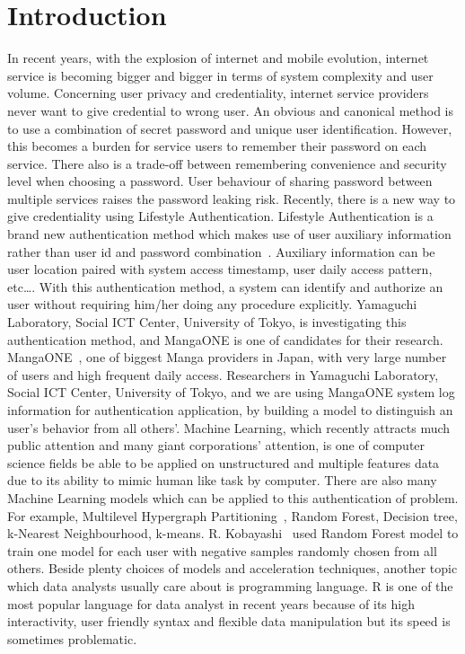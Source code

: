 \documentclass[English]{dicomopapers}
\begin{document}
\section{Introduction}
In recent years, with the explosion of internet and mobile evolution, internet service is becoming bigger and bigger in terms of system complexity and user volume. Concerning user privacy and credentiality, internet service providers never want to give credential to wrong user. An obvious and canonical method is to use a combination of secret password and unique user identification. However, this becomes a burden for service users to remember their password on each service. There also is a trade-off between remembering convenience and security level when choosing a password. User behaviour of sharing password between multiple services raises the password leaking risk. Recently, there is a new way to give credentiality using Lifestyle Authentication. Lifestyle Authentication is a brand new authentication method which makes use of user auxiliary information rather than user id and password combination~\cite{weko_175884_1}. Auxiliary information can be user location paired with system access timestamp, user daily access pattern, etc\ldots. With this authentication method, a system can identify and authorize an user without requiring him/her doing any procedure explicitly. Yamaguchi Laboratory, Social ICT Center, University of Tokyo, is investigating this authentication method, and MangaONE is one of candidates for their research.\newline
MangaONE~\cite{mangaone}, one of biggest Manga providers in Japan, with very large number of users and high frequent daily access. Researchers in Yamaguchi Laboratory, Social ICT Center, University of Tokyo, and we are using MangaONE system log information for authentication application, by building a model to distinguish an user's behavior from all others'. Machine Learning, which recently attracts much public attention and many giant corporations' attention, is one of computer science fields be able to be applied on unstructured and multiple features data due to its ability to mimic human like task by computer. There are also many Machine Learning models which can be applied to this authentication of problem. For example, Multilevel Hypergraph Partitioning~\cite{karypis1999multilevel}, Random Forest, Decision tree, k-Nearest Neighbourhood, k-means. R. Kobayashi~\cite{kobayashi1} used Random Forest model to train one model for each user with negative samples randomly chosen from all others. Beside plenty choices of models and acceleration techniques, another topic which data analysts usually care about is programming language. R is one of the most popular language for data analyst in recent years because of its high interactivity, user friendly syntax and flexible data manipulation but its speed is sometimes problematic.\newline
\end{document}
